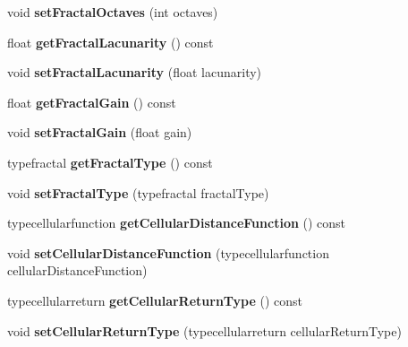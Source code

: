 \begin{DoxyCompactItemize}
void {\bfseries set\+Fractal\+Octaves} (int octaves)
\item 
\mbox{\label{classnoisefast_ab49ba23ad201e41b3211611ba1da70dd}} 
float {\bfseries get\+Fractal\+Lacunarity} () const
\item 
\mbox{\label{classnoisefast_a5f023e45dccb4f616b13aec4cf3316b9}} 
void {\bfseries set\+Fractal\+Lacunarity} (float lacunarity)
\item 
\mbox{\label{classnoisefast_ac9cd098602a08f2f80a3279baddeed81}} 
float {\bfseries get\+Fractal\+Gain} () const
\item 
\mbox{\label{classnoisefast_a99921da2152d620353d63d6812c954dd}} 
void {\bfseries set\+Fractal\+Gain} (float gain)
\item 
\mbox{\label{classnoisefast_a0b746e46d247f234eec3c706b55a8d56}} 
typefractal {\bfseries get\+Fractal\+Type} () const
\item 
\mbox{\label{classnoisefast_a8c0158caec6179203d48411927f02798}} 
void {\bfseries set\+Fractal\+Type} (typefractal fractal\+Type)
\item 
\mbox{\label{classnoisefast_af6ca8899e9c9a662516a74457d41e9e0}} 
typecellularfunction {\bfseries get\+Cellular\+Distance\+Function} () const
\item 
\mbox{\label{classnoisefast_ad843628169753f63b8b8e8c359911a26}} 
void {\bfseries set\+Cellular\+Distance\+Function} (typecellularfunction cellular\+Distance\+Function)
\item 
\mbox{\label{classnoisefast_a555a52115f47b5c4b97a35dc5876e5f5}} 
typecellularreturn {\bfseries get\+Cellular\+Return\+Type} () const
\item 
\mbox{\label{classnoisefast_aa318ec34c111517a68393d897978f62d}} 
void {\bfseries set\+Cellular\+Return\+Type} (typecellularreturn cellular\+Return\+Type)
\item 
\mbox{\label{classnoisefast_a322ace46e0548fc056ebc4218e86c840}} 

\end{DoxyCompactItemize}
